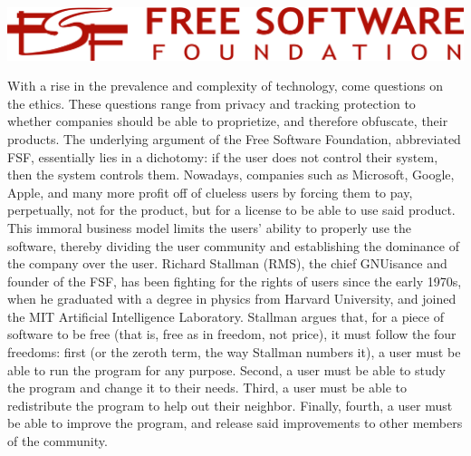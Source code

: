 \documentclass[12pt]{article}
\begin{document}
\begin{center}
  \includegraphics[width=.9\textwidth]{Images/FSFLogo.png}
\end{center}

\begin{multicols}{3}

  With a rise in the prevalence and complexity of technology, come questions on the ethics. These questions range from privacy and tracking protection to whether companies should be able to proprietize, and therefore obfuscate, their products. The underlying argument of the Free Software Foundation, abbreviated FSF, essentially lies in a dichotomy: if the user does not control their system, then the system controls them. Nowadays, companies such as Microsoft, Google, Apple, and many more profit off of clueless users by forcing them to pay, perpetually, not for the product, but for a license to be able to use said product. This immoral business model limits the users' ability to properly use the software, thereby dividing the user community and establishing the dominance of the company over the user. Richard Stallman (RMS), the chief GNUisance and founder of the FSF, has been fighting for the rights of users since the early 1970s, when he graduated with a degree in physics from Harvard University, and joined the MIT Artificial Intelligence Laboratory.  Stallman argues that, for a piece of software to be free (that is, free as in freedom, not price), it must follow the four freedoms: first (or the zeroth term, the way Stallman numbers it), a user must be able to run the program for any purpose. Second, a user must be able to study the program and change it to their needs. Third, a user must be able to redistribute the program to help out their neighbor. Finally, fourth, a user must be able to improve the program, and release said improvements to other members of the community. 

  \vfill


\end{multicols}
\end{document}
